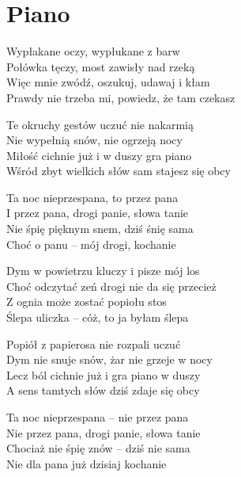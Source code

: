 \section{Piano}
\begin{text}
Wypłakane oczy, wypłukane z barw\\
Połówka tęczy, most zawisły nad rzeką\\
Więc mnie zwódź, oszukuj, udawaj i kłam\\
Prawdy nie trzeba mi, powiedz, że tam czekasz

Te okruchy gestów uczuć nie nakarmią\\
Nie wypełnią snów, nie ogrzeją nocy\\
Miłość cichnie już i w duszy gra piano\\
Wśród zbyt wielkich słów sam stajesz się obcy

Ta noc nieprzespana, to przez pana\\
I przez pana, drogi panie, słowa tanie\\
Nie śpię pięknym snem, dziś śnię sama\\
Choć o panu – mój drogi, kochanie

Dym w powietrzu kluczy i pisze mój los\\
Choć odczytać zeń drogi nie da się przecież\\
Z ognia może zostać popiołu stos\\
Ślepa uliczka – cóż, to ja byłam ślepa

Popiół z papierosa nie rozpali uczuć\\
Dym nie snuje snów, żar nie grzeje w nocy\\
Lecz ból cichnie już i gra piano w duszy\\
A sens tamtych słów dziś zdaje się obcy

Ta noc nieprzespana – nie przez pana\\
Nie przez pana, drogi panie, słowa tanie\\
Chociaż nie śpię znów – dziś nie sama\\
Nie dla pana już dzisiaj kochanie
\end{text}